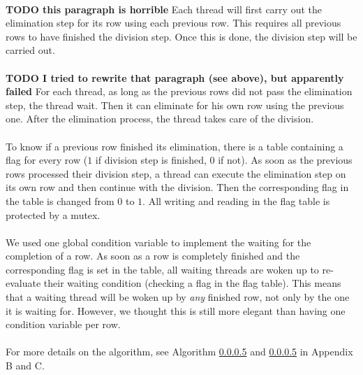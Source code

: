 \documentclass[]{article}
\begin{document}
\paragraph{} \textbf{TODO this paragraph is horrible} Each thread will first carry out the elimination step for its row using each previous row. This requires all previous rows to have finished the division step. Once this is done, the division step will be carried out.

\paragraph{} \textbf{TODO I tried to rewrite that paragraph (see above), but apparently failed} For each thread, as long as the previous rows did not pass the elimination step, the thread wait. Then it can eliminate for his own row using the previous one. After the elimination process, the thread takes care of the division.

\paragraph{} To know if a previous row finished its elimination, there is a table containing a flag for every row ($1$ if division step is finished, $0$ if not). As soon as the previous rows processed their division step, a thread can execute the elimination step on its own row and then continue with the division. Then the corresponding flag in the table is changed from $0$ to $1$. All writing and reading in the flag table is protected by a mutex.

\paragraph{} We used one global condition variable to implement the waiting for the completion of a row. As soon as a row is completely finished and the corresponding flag is set in the table, all waiting threads are woken up to re-evaluate their waiting condition (checking a flag in the flag table). This means that a waiting thread will be woken up by \emph{any} finished row, not only by the one it is waiting for. However, we thought this is still more elegant than having one condition variable per row.

\paragraph{} For more details on the algorithm, see Algorithm \ref{} and \ref{} in Appendix B and C.
\end{document}
